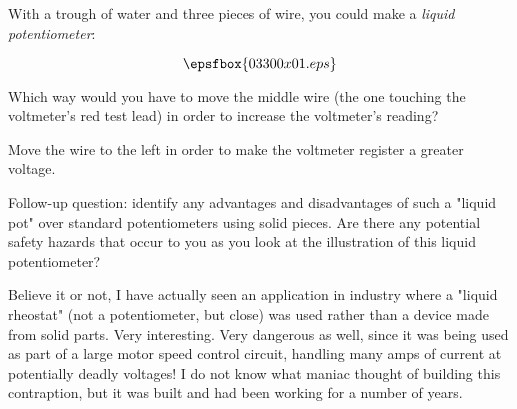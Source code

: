

With a trough of water and three pieces of wire, you could make a {\it liquid potentiometer}:

$$\epsfbox{03300x01.eps}$$

Which way would you have to move the middle wire (the one touching the voltmeter's red test lead) in order to increase the voltmeter's reading?







Move the wire to the left in order to make the voltmeter register a greater voltage.

\vskip 10pt

Follow-up question: identify any advantages and disadvantages of such a "liquid pot" over standard potentiometers using solid pieces.  Are there any potential safety hazards that occur to you as you look at the illustration of this liquid potentiometer?







Believe it or not, I have actually seen an application in industry where a "liquid rheostat" (not a potentiometer, but close) was used rather than a device made from solid parts.  Very interesting.  Very dangerous as well, since it was being used as part of a large motor speed control circuit, handling many amps of current at potentially deadly voltages!  I do not know what maniac thought of building this contraption, but it was built and had been working for a number of years.




